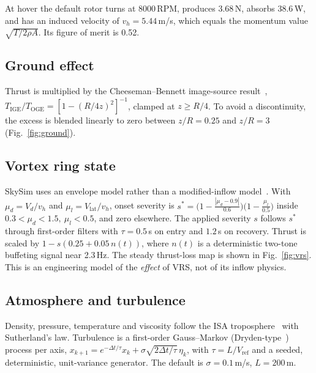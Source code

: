 \documentclass{ieeeaccess}
\newcommand{\skysim}{SkySim\xspace}
\begin{document}
At hover the default rotor turns at 8000\,RPM, produces 3.68\,N, absorbs
38.6\,W, and has an induced velocity of $v_h=5.44$\,m/s, which equals the
momentum value $\sqrt{T/2\rho A}$. Its figure of merit is 0.52.

\subsection{Ground effect}
Thrust is multiplied by the Cheeseman--Bennett image-source
result~\cite{cheeseman1955ground},
$T_\text{IGE}/T_\text{OGE}=[1-(R/4z)^2]^{-1}$, clamped at $z\ge R/4$. To avoid a
discontinuity, the excess is blended linearly to zero between $z/R=0.25$ and
$z/R=3$ (Fig.~\ref{fig:ground}).

\subsection{Vortex ring state}
\skysim uses an envelope model rather than a modified-inflow
model~\cite{johnson2005vrs}. With $\mu_d=V_d/v_h$ and $\mu_l=V_\text{lat}/v_h$,
onset severity is
$s^\ast=\big(1-\frac{|\mu_d-0.9|}{0.6}\big)\big(1-\frac{\mu_l}{0.5}\big)$ inside
$0.3<\mu_d<1.5,\ \mu_l<0.5$, and zero elsewhere. The applied severity $s$
follows $s^\ast$ through first-order filters with $\tau=0.5$\,s on entry and
$1.2$\,s on recovery. Thrust is scaled by $1-s(0.25+0.05\,n(t))$, where $n(t)$
is a deterministic two-tone buffeting signal near 2.3\,Hz. The steady
thrust-loss map is shown in Fig.~\ref{fig:vrs}. This is an engineering model of
the \emph{effect} of VRS, not of its inflow physics.

\subsection{Atmosphere and turbulence}
Density, pressure, temperature and viscosity follow the ISA
troposphere~\cite{isa1975} with Sutherland's law. Turbulence is a first-order
Gauss--Markov (Dryden-type~\cite{milhdbk1797}) process per axis,
$x_{k+1}=e^{-\Delta t/\tau}x_k+\sigma\sqrt{2\Delta t/\tau}\,\eta_k$, with
$\tau=L/V_\text{ref}$ and a seeded, deterministic, unit-variance generator. The
default is $\sigma=0.1$\,m/s, $L=200$\,m.
\end{document}
